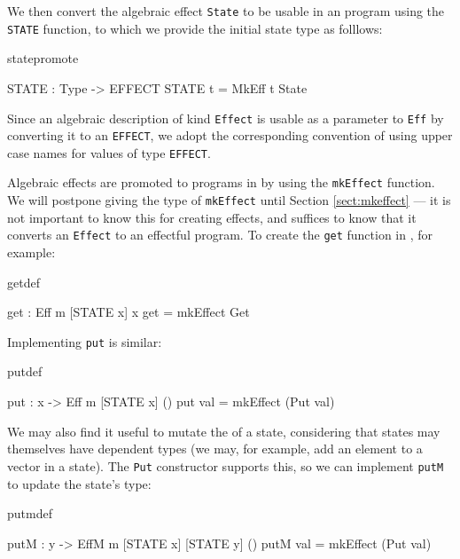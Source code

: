 We then convert the algebraic effect \texttt{State} to be usable in an
\Eff{} program using the \texttt{STATE} function, to which we provide the
initial state type as folllows:

\begin{SaveVerbatim}{statepromote}

STATE : Type -> EFFECT
STATE t = MkEff t State

\end{SaveVerbatim}

\noindent
Since an algebraic description of kind \texttt{Effect} is usable as a
parameter to \texttt{Eff} by converting it to an \texttt{EFFECT}, we adopt the
corresponding convention of using upper case names for values of type
\texttt{EFFECT}.

Algebraic effects are promoted to programs in \Eff{} by using the
\texttt{mkEffect} function. We will postpone giving the type of
\texttt{mkEffect} until Section \ref{sect:mkeffect} --- it is not important to
know this for creating effects, and suffices to know that it converts an
\texttt{Effect} to an effectful program. To create the \texttt{get} function in
\Eff{}, for example:

\begin{SaveVerbatim}{getdef}

get : Eff m [STATE x] x
get = mkEffect Get 

\end{SaveVerbatim}

\noindent
Implementing \texttt{put} is similar:

\begin{SaveVerbatim}{putdef}

put : x -> Eff m [STATE x] ()
put val = mkEffect (Put val)

\end{SaveVerbatim}

\noindent
We may also find it useful to mutate the  of a state, considering
that states may themselves have dependent types (we may, for example, add
an element to a vector in a state). The \texttt{Put} constructor supports this,
so we can implement \texttt{putM} to update the state's type:

\begin{SaveVerbatim}{putmdef}

putM : y -> EffM m [STATE x] [STATE y] ()
putM val = mkEffect (Put val)

\end{SaveVerbatim}

